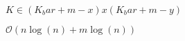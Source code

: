 \documentclass{article}
\begin{document}
$ K \in (K_bar + m -x) x (K_bar +m -y) $
\pagebreak

$ \mathcal{O}(n \log(n) + m \log(n)) $
\pagebreak
\end{document}
